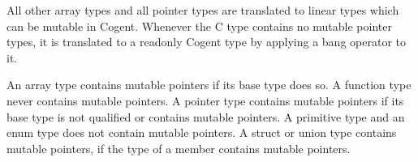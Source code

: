 All other array types and all pointer types are translated to linear types which can be mutable in
Cogent. Whenever the C type contains no mutable pointer types, it is translated to a readonly Cogent type by 
applying a bang operator to it.

An array type contains mutable pointers if its base type does so. A function type never contains mutable pointers.
A pointer type contains mutable pointers if its base type is not  qualified or contains mutable pointers.
A primitive type and an enum type does not contain mutable pointers. A struct or union type contains mutable 
pointers, if the type of a member contains mutable pointers.

